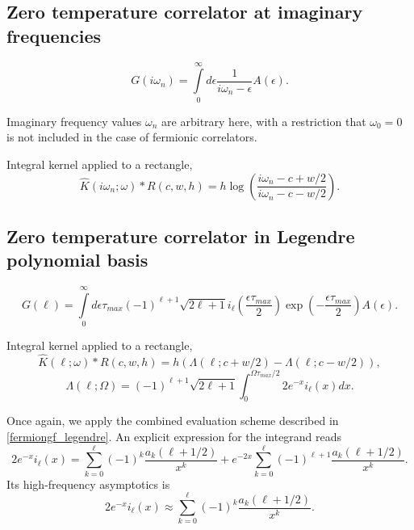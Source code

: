 \documentclass[]{article}
\begin{document}
\subsection{Zero temperature correlator at imaginary frequencies}
\label{zerotemp_imfreq}
\begin{equation}
	G(i\omega_n) = \int\limits_0^\infty
	d\epsilon \frac{1}{i\omega_n-\epsilon} A(\epsilon).
\end{equation}

Imaginary frequency values $\omega_n$ are arbitrary here, with a restriction that
$\omega_0 = 0$ is not included in the case of fermionic correlators.

Integral kernel applied to a rectangle,
\begin{equation}
\hat K(i\omega_n;\omega)*R(c,w,h) =
h \log\left(\frac{i\omega_n - c + w/2}{i\omega_n - c - w/2}\right).
\end{equation}

\subsection{Zero temperature correlator in Legendre polynomial basis}
\label{zerotemp_legendre}
\begin{equation}
	G(\ell) =
	\int\limits_0^\infty d\epsilon
	\tau_{max}(-1)^{\ell+1}\sqrt{2\ell+1}
	i_{\ell}\left(\frac{\epsilon\tau_{max}}{2}\right)
	\exp\left(-\frac{\epsilon\tau_{max}}{2}\right) A(\epsilon).
\end{equation}

Integral kernel applied to a rectangle,
\begin{equation}
	\hat K(\ell;\omega)*R(c,w,h) = h (\Lambda(\ell;c+w/2) - \Lambda(\ell;c-w/2)),
\end{equation}
\begin{equation}
	\Lambda(\ell;\Omega) = (-1)^{\ell+1}\sqrt{2\ell+1}
	\int_0^{\Omega\tau_{max}/2} 2e^{-x} i_\ell(x) dx.
\end{equation}

Once again, we apply the combined evaluation scheme described in
\ref{fermiongf_legendre}. An explicit expression for the integrand reads
\begin{equation}\label{il_x_exp_series}
	2e^{-x} i_\ell(x) =
	\sum_{k=0}^\ell(-1)^k
	\frac{a_k(\ell+1/2)}{x^k} +
	e^{-2x}\sum_{k=0}^\ell(-1)^{\ell+1}
	\frac{a_k(\ell+1/2)}{x^k}.
\end{equation}
Its high-frequency asymptotics is
\begin{equation}
	2e^{-x} i_\ell(x) \approx
	\sum_{k=0}^\ell(-1)^k \frac{a_k(\ell+1/2)}{x^k}.
\end{equation}
\end{document}
